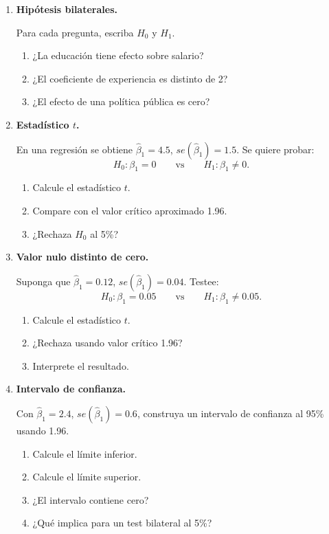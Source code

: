 \documentclass[11pt]{article}
\begin{document}
\begin{enumerate}[label=\textbf{Ejercicio \arabic*.}, leftmargin=*]

\item \textbf{Hipótesis bilaterales.}

Para cada pregunta, escriba \(H_0\) y \(H_1\).

\begin{enumerate}[label=\alph*)]
    \item ¿La educación tiene efecto sobre salario?
    \item ¿El coeficiente de experiencia es distinto de 2?
    \item ¿El efecto de una política pública es cero?
\end{enumerate}

\item \textbf{Estadístico \(t\).}

En una regresión se obtiene \(\hat{\beta}_1=4.5\), \(se(\hat{\beta}_1)=1.5\). Se quiere probar:
\[
H_0:\beta_1=0
\qquad\text{vs}\qquad
H_1:\beta_1\neq 0.
\]

\begin{enumerate}[label=\alph*)]
    \item Calcule el estadístico \(t\).
    \item Compare con el valor crítico aproximado 1.96.
    \item ¿Rechaza \(H_0\) al 5\%?
\end{enumerate}

\item \textbf{Valor nulo distinto de cero.}

Suponga que \(\hat{\beta}_1=0.12\), \(se(\hat{\beta}_1)=0.04\). Testee:
\[
H_0:\beta_1=0.05
\qquad\text{vs}\qquad
H_1:\beta_1\neq 0.05.
\]

\begin{enumerate}[label=\alph*)]
    \item Calcule el estadístico \(t\).
    \item ¿Rechaza usando valor crítico 1.96?
    \item Interprete el resultado.
\end{enumerate}

\item \textbf{Intervalo de confianza.}

Con \(\hat{\beta}_1=2.4\), \(se(\hat{\beta}_1)=0.6\), construya un intervalo de confianza al 95\% usando 1.96.

\begin{enumerate}[label=\alph*)]
    \item Calcule el límite inferior.
    \item Calcule el límite superior.
    \item ¿El intervalo contiene cero?
    \item ¿Qué implica para un test bilateral al 5\%?
\end{enumerate}


\end{enumerate}
\end{document}
